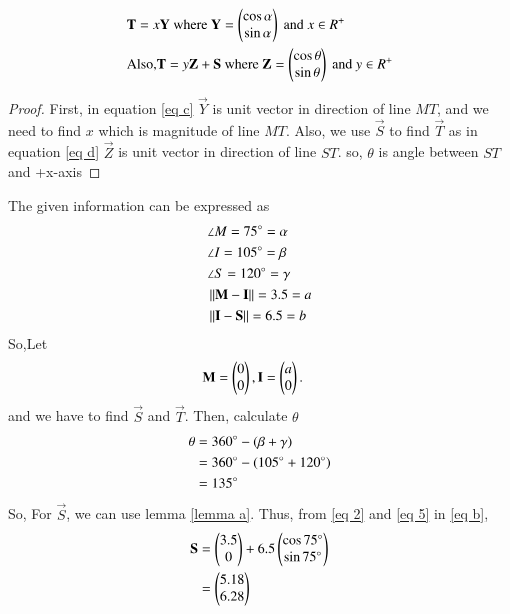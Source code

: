 \documentclass[journal,12pt,twocolumn]{IEEEtran}
\begin{document}
\begin{lemma}
\label{lemma b}
\begin{align}
&\mathbf{T} = x\mathbf{Y} \text{ where } \mathbf{Y} = \begin{pmatrix}\cos\alpha\\\sin \alpha\end{pmatrix}\text{ and } x \in R^{+} \label{eq c}\\
&\text{Also,} \mathbf{T} = y\mathbf{Z}+\mathbf{S} \text{ where } \mathbf{Z} =  \begin{pmatrix}\cos\theta\\\sin\theta\end{pmatrix} \text{ and }y \in R^{+} \label{eq d}
\end{align}
\end{lemma}
\begin{proof}
First, in equation \eqref{eq c} $\vec{Y}$ is unit vector in direction of line $MT$, and we need to find $x$ which is magnitude of line $MT$. Also, we use $\vec{S}$ to find $\vec{T}$ as in equation \eqref{eq d} $\vec{Z}$ is unit vector in direction of line $ST$. so, $\theta$ is angle between $ST$ and +x-axis
\end{proof}
The given information can be expressed as
\begin{align}
    &\angle M = 75\degree = \alpha \label{eq 1}
    \\
    &\angle I = 105\degree = \beta \label{eq 2}
    \\
    &\angle S = 120\degree = \gamma \label{eq 3}
    \\
    &\left\lVert\mathbf{M}-\mathbf{I}\right\rVert = 3.5 = a \label{eq 4}
    \\
    &\left\lVert\mathbf{I}-\mathbf{S}\right\rVert = 6.5 = b \label{eq 5}
\end{align}
So,Let  
\begin{align}
&\mathbf{M}=\begin{pmatrix}0\\0\end{pmatrix},\mathbf{I}=\begin{pmatrix}a\\0\end{pmatrix}.
\end{align}
and we have to find $\vec{S}$ and $\vec{T}$. Then, calculate $\theta$
\begin{align}
\theta &= 360\degree - (\beta + \gamma)\\
       &= 360\degree - (105\degree + 120\degree)\\
       &= 135\degree \label{eq a}
\end{align}
So, For $\vec{S}$, we can use lemma \ref{lemma a}. Thus, from  \eqref{eq 2} and \eqref{eq 5} in \eqref{eq b},
\begin{align}
\mathbf{S} &=\begin{pmatrix}3.5\\0\end{pmatrix} + 6.5\begin{pmatrix}\cos 75\degree \\\sin 75\degree \end{pmatrix}\label{eq e}
\\
&=\begin{pmatrix}5.18\\6.28\end{pmatrix}
\end{align}
\end{document}
